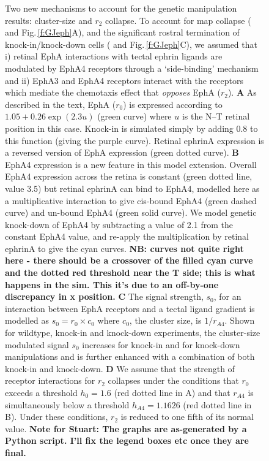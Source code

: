 \documentclass[11pt, a4paper]{article}
\begin{document}
\begin{figure}
\caption{Two new mechanisms to account for the genetic manipulation results: cluster-size and $r_2$ collapse. To account for map collapse (\citet{brown_topographic_2000} and Fig.\,\ref{f:GJeph}A), and the significant rostral termination of knock-in/knock-down cells (\citet{reber_relative_2004} and Fig.\,\ref{f:GJeph}C), we assumed that i) retinal EphA interactions with tectal ephrin ligands are modulated by EphA4 receptors through a `side-binding' mechanism and ii) EphA3 and EphA4 receptors interact with the receptors which mediate the chemotaxis effect that \emph{opposes} EphA ($r_2$). \textbf{A} As described in the text, EphA ($r_0$) is expressed according to $1.05 + 0.26 \exp(2.3 u)$ (green curve) where $u$ is the N--T retinal position in this case. Knock-in is simulated simply by adding 0.8 to this function (giving the purple curve). Retinal ephrinA expression is a reversed version of EphA expression (green dotted curve). \textbf{B} EphA4 expression is a new feature in this model extension. Overall EphA4 expression across the retina is constant (green dotted line, value 3.5) but retinal ephrinA can bind to EphA4, modelled here as a multiplicative interaction to give cis-bound EphA4 (green dashed curve) and un-bound EphA4 (green solid curve). We model genetic knock-down of EphA4 by subtracting a value of 2.1 from the constant EphA4 value, and re-apply the multiplication by retinal ephrinA to give the cyan curves. \textbf{NB: curves not quite right here - there should be a crossover of the filled cyan curve and the dotted red threshold near the T side; this is what happens in the sim. This it's due to an off-by-one discrepancy in x position.} \textbf{C} The signal strength, $s_0$, for an interaction between EphA receptors and a tectal ligand gradient is modelled as $s_0 = r_0 \times c_0$ where $c_0$, the cluster size, is $1/r_{A4}$. Shown for wildtype, knock-in and knock-down experiments, the cluster-size modulated signal $s_0$ increases for knock-in and for knock-down manipulations and is further enhanced with a combination of both knock-in and knock-down. \textbf{D} We assume that the strength of receptor interactions for $r_2$ collapses under the conditions that $r_0$ exceeds a threshold $h_0=1.6$ (red dotted line in A) and that $r_{A4}$ is simultaneously below a threshold $h_{A4}=1.1626$ (red dotted line in B). Under these conditions, $r_2$ is reduced to one fifth of its normal value. \textbf{Note for Stuart: The graphs are as-generated by a Python script. I'll fix the legend boxes etc once they are final.}}
\label{f:clustermech}
\end{figure}
\end{document}
